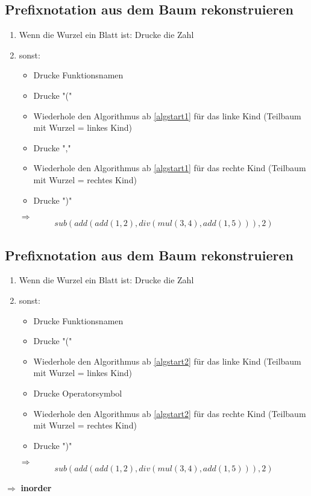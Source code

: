 \documentclass[a4paper]{scrartcl}
\begin{document}
\subsection{Prefixnotation aus dem Baum rekonstruieren}
\label{sec-6-4}
\begin{enumerate}
\item \label{algstart1} Wenn die Wurzel ein Blatt ist: Drucke die Zahl
\item sonst:
\begin{itemize}
\item Drucke Funktionsnamen
\item Drucke "("
\item Wiederhole den Algorithmus ab \ref{algstart1} für das linke Kind (Teilbaum mit Wurzel = linkes Kind)
\item Drucke ","
\item Wiederhole den Algorithmus ab \ref{algstart1} für das rechte Kind (Teilbaum mit Wurzel = rechtes Kind)
\item Drucke ")"
\end{itemize}
$\Rightarrow$ \[sub(add(add(1,2),div(mul(3,4),add(1,5))), 2)\]
\end{enumerate}
\subsection{Prefixnotation aus dem Baum rekonstruieren}
\label{sec-6-5}
\begin{enumerate}
\item \label{algstart2} Wenn die Wurzel ein Blatt ist: Drucke die Zahl
\item sonst:
\begin{itemize}
\item Drucke Funktionsnamen
\item Drucke "("
\item Wiederhole den Algorithmus ab \ref{algstart2} für das linke Kind (Teilbaum mit Wurzel = linkes Kind)
\item Drucke Operatorsymbol
\item Wiederhole den Algorithmus ab \ref{algstart2} für das rechte Kind (Teilbaum mit Wurzel = rechtes Kind)
\item Drucke ")"
\end{itemize}
$\Rightarrow$ \[sub(add(add(1,2),div(mul(3,4),add(1,5))), 2)\]
\end{enumerate}
$\Rightarrow$ \textbf{inorder}
\end{document}
